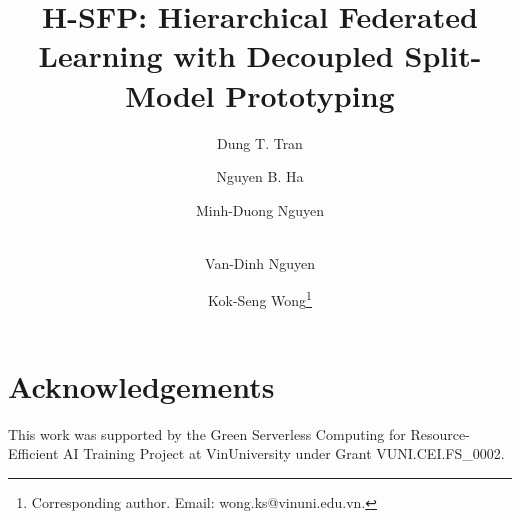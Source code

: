 \documentclass[runningheads]{llncs}
\begin{document}
\title{H-SFP: Hierarchical Federated Learning with Decoupled Split-Model Prototyping}



\author{Dung T. Tran 
\and
Nguyen B. Ha
\and
Minh-Duong Nguyen
\and \\
Van-Dinh Nguyen
\and
Kok-Seng Wong\setcounter{footnote}{3}\thanks{Corresponding author. Email: wong.ks@vinuni.edu.vn.}
}





\maketitle
    




% 



\section*{Acknowledgements}
This work was supported by the Green Serverless Computing
for Resource-Efficient AI Training Project at VinUniversity under Grant VUNI.CEI.FS\_0002. 
%
%
\clearpage



% 
% 
% 
% 
\end{document}
